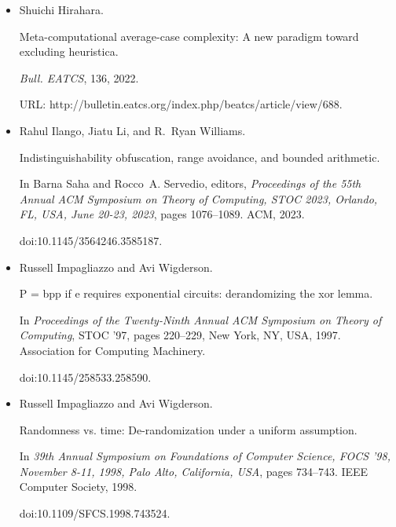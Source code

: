 \begin{itemize}
doi:10.4230/LIPICS.APPROX/RANDOM.2022.20.





\item[] 
[13]

Shuichi Hirahara.


Meta-computational average-case complexity: A new paradigm toward
excluding heuristica.


\emph{Bull. EATCS}, 136, 2022.


URL:
http://bulletin.eatcs.org/index.php/beatcs/article/view/688.





\item[] 
[14]

Rahul Ilango, Jiatu Li, and R. Ryan Williams.


Indistinguishability obfuscation, range avoidance, and bounded
arithmetic.


In Barna Saha and Rocco A. Servedio, editors, \emph{Proceedings of the
55th Annual ACM Symposium on Theory of Computing, STOC 2023, Orlando, FL,
USA, June 20-23, 2023}, pages 1076–1089. ACM, 2023.


doi:10.1145/3564246.3585187.





\item[] 
[15]

Russell Impagliazzo and Avi Wigderson.


P = bpp if e requires exponential circuits: derandomizing the xor
lemma.


In \emph{Proceedings of the Twenty-Ninth Annual ACM Symposium on
Theory of Computing}, STOC ’97, pages 220–229, New York, NY, USA, 1997.
Association for Computing Machinery.


doi:10.1145/258533.258590.





\item[] 
[16]

Russell Impagliazzo and Avi Wigderson.


Randomness vs. time: De-randomization under a uniform assumption.


In \emph{39th Annual Symposium on Foundations of Computer Science,
FOCS ’98, November 8-11, 1998, Palo Alto, California, USA}, pages
734–743. IEEE Computer Society, 1998.


doi:10.1109/SFCS.1998.743524.






\end{itemize}
